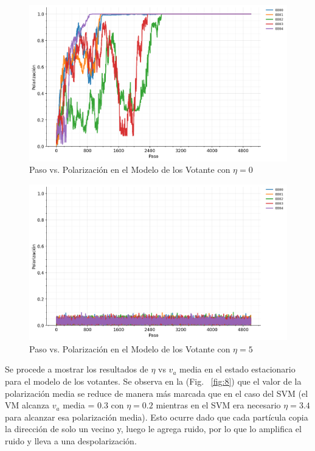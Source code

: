 \documentclass{article}
\begin{document}
\begin{figure} [H]
    \centering
    \includegraphics[width=1\linewidth]{noise-0.000-voters.png}
    \caption{Paso vs. Polarización en el Modelo de los Votante con \(\eta =0\)}
    \label{fig:6}
\end{figure}
\begin{figure} [H]
    \centering
    \includegraphics[width=1\linewidth]{noise-5.000-voters.png}
    \caption{Paso vs. Polarización en el Modelo de los Votante con \(\eta =5\)}
    \label{fig:7}
\end{figure}


Se procede a mostrar los resultados de \(\eta\) vs \(v_a\) media en el estado estacionario para el modelo de los votantes. Se observa en la (Fig. ~\ref{fig:8}) que el valor de la polarización media se reduce de manera más marcada que en el caso del SVM (el VM alcanza \(v_a\) media = \(0.3\) con \(\eta =0.2\) mientras en el SVM era necesario \(\eta=3.4\) para alcanzar esa polarización media). 
Esto ocurre dado que cada partícula copia la dirección de solo un vecino y, luego le agrega ruido, por lo que lo amplifica el ruido y lleva a una despolarización.
\end{document}
